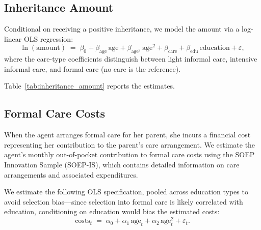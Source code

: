 \subsection{Inheritance Amount}
\label{sec:inheritance_amount}

Conditional on receiving a positive inheritance, we model the amount via a
log-linear OLS regression:
\begin{equation}
  \ln(\text{amount})
  \;=\; \beta_0
  + \beta_{\text{age}}\,\text{age}
  + \beta_{\text{age}^2}\,\text{age}^2
  + \beta_{\text{care}}
  + \beta_{\text{edu}}\,\text{education}
  + \varepsilon,
  \label{eq:inheritance_amount}
\end{equation}
where the care-type coefficients distinguish between light informal care,
intensive informal care, and formal care (no care is the reference).

Table~\ref{tab:inheritance_amount} reports the estimates.

\begin{table}[htbp]
\centering
\caption{Inheritance Amount --- OLS Parameters}
\label{tab:inheritance_amount}

\end{table}


\subsection{Formal Care Costs}
\label{sec:formal_care_costs}

When the agent arranges formal care for her parent, she incurs a financial
cost representing her contribution to the parent's care arrangement.  We
estimate the agent's monthly out-of-pocket contribution to formal care
costs using the SOEP Innovation Sample (SOEP-IS), which contains detailed
information on care arrangements and associated expenditures.

We estimate the following OLS specification, pooled across education
types to avoid selection bias---since selection into formal care is likely
correlated with education, conditioning on education would bias the
estimated costs:
\begin{equation}
  \text{costs}_t
  \;=\; \alpha_0 + \alpha_1\,\text{age}_t
  + \alpha_2\,\text{age}_t^2 + \varepsilon_t.
  \label{eq:formal_care_costs}
\end{equation}

